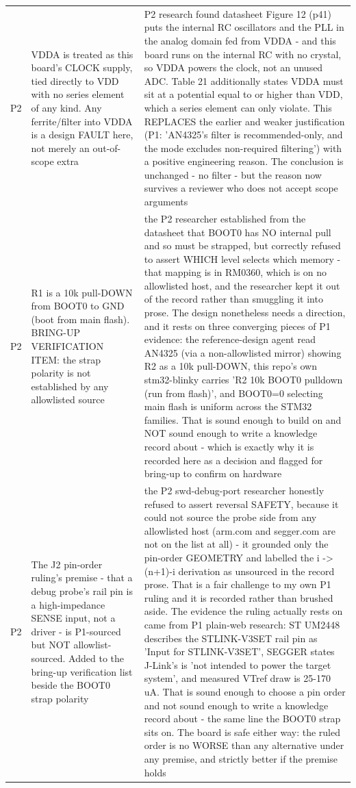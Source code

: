 \documentclass[11pt,a4paper]{article}
\begin{document}
{\begin{longtable}{lp{5.2cm}p{7.2cm}}
P2 & VDDA is treated as this board's CLOCK supply, tied directly to VDD with no series element of any kind. Any ferrite/filter into VDDA is a design FAULT here, not merely an out-of-scope extra & P2 research found datasheet Figure 12 (p41) puts the internal RC oscillators and the PLL in the analog domain fed from VDDA - and this board runs on the internal RC with no crystal, so VDDA powers the clock, not an unused ADC. Table 21 additionally states VDDA must sit at a potential equal to or higher than VDD, which a series element can only violate. This REPLACES the earlier and weaker justification (P1: 'AN4325's filter is recommended-only, and the mode excludes non-required filtering') with a positive engineering reason. The conclusion is unchanged - no filter - but the reason now survives a reviewer who does not accept scope arguments \\
P2 & R1 is a 10k pull-DOWN from BOOT0 to GND (boot from main flash). BRING-UP VERIFICATION ITEM: the strap polarity is not established by any allowlisted source & the P2 researcher established from the datasheet that BOOT0 has NO internal pull and so must be strapped, but correctly refused to assert WHICH level selects which memory - that mapping is in RM0360, which is on no allowlisted host, and the researcher kept it out of the record rather than smuggling it into prose. The design nonetheless needs a direction, and it rests on three converging pieces of P1 evidence: the reference-design agent read AN4325 (via a non-allowlisted mirror) showing R2 as a 10k pull-DOWN, this repo's own stm32-blinky carries 'R2 10k BOOT0 pulldown (run from flash)', and BOOT0=0 selecting main flash is uniform across the STM32 families. That is sound enough to build on and NOT sound enough to write a knowledge record about - which is exactly why it is recorded here as a decision and flagged for bring-up to confirm on hardware \\
P2 & The J2 pin-order ruling's premise - that a debug probe's rail pin is a high-impedance SENSE input, not a driver - is P1-sourced but NOT allowlist-sourced. Added to the bring-up verification list beside the BOOT0 strap polarity & the P2 swd-debug-port researcher honestly refused to assert reversal SAFETY, because it could not source the probe side from any allowlisted host (arm.com and segger.com are not on the list at all) - it grounded only the pin-order GEOMETRY and labelled the i -\textgreater{} (n+1)-i derivation as unsourced in the record prose. That is a fair challenge to my own P1 ruling and it is recorded rather than brushed aside. The evidence the ruling actually rests on came from P1 plain-web research: ST UM2448 describes the STLINK-V3SET rail pin as 'Input for STLINK-V3SET', SEGGER states J-Link's is 'not intended to power the target system', and measured VTref draw is 25-170 uA. That is sound enough to choose a pin order and not sound enough to write a knowledge record about - the same line the BOOT0 strap sits on. The board is safe either way: the ruled order is no WORSE than any alternative under any premise, and strictly better if the premise holds \\

\end{longtable}}
\end{document}
